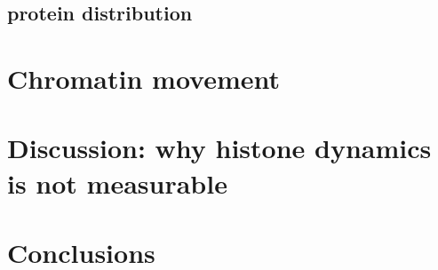     \subsection{protein distribution}


\section{Chromatin movement}




\section{Discussion: why histone dynamics is not measurable}


\section{Conclusions}



